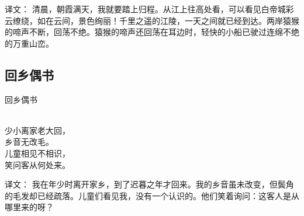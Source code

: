 译文：
清晨，朝霞满天，我就要踏上归程。从江上往高处看，可以看见白帝城彩云缭绕，如在云间，景色绚丽！千里之遥的江陵，一天之间就已经到达。两岸猿猴的啼声不断，回荡不绝。猿猴的啼声还回荡在耳边时，轻快的小船已驶过连绵不绝的万重山峦。

\subsection{回乡偶书}

\noindent 回乡偶书

 \\

\noindent 少小离家老大回，\\乡音无改毛。\\
儿童相见不相识，\\笑问客从何处来。

译文：
我在年少时离开家乡，到了迟暮之年才回来。我的乡音虽未改变，但鬓角的毛发却已经疏落。儿童们看见我，没有一个认识的。他们笑着询问：这客人是从哪里来的呀？